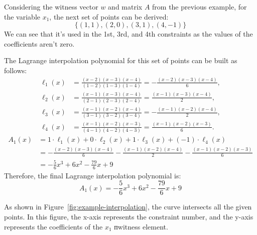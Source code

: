 \documentclass[../lecture-notes.tex]{subfiles}
\begin{document}
\begin{example}
    Considering the witness vector $w$ and matrix $A$ from the previous example, for the variable
    $x_1$, the next set of points can be derived:
    \begin{equation*}
        \{(1,1), (2,0), (3,1), (4,-1)\}
    \end{equation*}
    We can see that it's used in the 1st, 3rd, and 4th constraints as the values of the coefficients
    aren't zero.
    
    The Lagrange interpolation polynomial for this set of points can be built as follows:
    \begin{align*}
        \ell_1(x) &= \frac{(x - 2)(x - 3)(x - 4)}{(1 - 2)(1 - 3)(1 - 4)} = -\frac{(x - 2)(x - 3)(x - 4)}{6}, \\
        \ell_2(x) &= \frac{(x - 1)(x - 3)(x - 4)}{(2 - 1)(2 - 3)(2 - 4)} = \frac{(x - 1)(x - 3)(x - 4)}{2}, \\
        \ell_3(x) &= \frac{(x - 1)(x - 2)(x - 4)}{(3 - 1)(3 - 2)(3 - 4)} = -\frac{(x - 1)(x - 2)(x - 4)}{2}, \\
        \ell_4(x) &= \frac{(x - 1)(x - 2)(x - 3)}{(4 - 1)(4 - 2)(4 - 3)} = \frac{(x - 1)(x - 2)(x - 3)}{6}.
    \end{align*}
    \begin{align*}
        A_1(x) &= 1 \cdot \ell_1(x) + 0 \cdot \ell_2(x) + 1 \cdot \ell_3(x) + (-1) \cdot \ell_4(x) \\
        &= -\frac{(x - 2)(x - 3)(x - 4)}{6} - \frac{(x - 1)(x - 2)(x - 4)}{2} - \frac{(x - 1)(x - 2)(x - 3)}{6} \\
        &= -\frac{5}{6}x^3 + 6x^2 - \frac{79}{6}x + 9
    \end{align*}
    Therefore, the final Lagrange interpolation polynomial is:
    \begin{equation*}
        A_1(x) = -\frac{5}{6}x^3 + 6x^2 - \frac{79}{6}x + 9
    \end{equation*}

    As shown in Figure~\ref{fig:example-interpolation}, the curve intersects all the given points.
    In this figure, the x-axis represents the constraint number, and the y-axis represents the 
    coefficients of the $x_1$ пwitness element.
\end{example}
\end{document}
